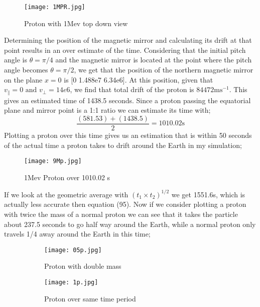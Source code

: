 \documentclass[14paper,11pt,hidelinks]{article}
\begin{document}
\begin{figure}[h!]
\centering
\texttt{[image: 1MPR.jpg]} 
\caption{Proton with 1Mev top down view}
\end{figure}
\FloatBarrier
\noindent
Determining the position of the magnetic mirror and calculating its drift at that point results in an over estimate of the time. Considering that the initial pitch angle is \begin{math}\theta=\pi/4\end{math} and the magnetic mirror is located at the point where the pitch angle becomes \begin{math} \theta=\pi/2 \end{math}, we get that the position of the northern magnetic mirror on the plane \begin{math}x=0\end{math} is [0 1.488e7 6.34e6]. 
\newline
\newline
At this position, given that \begin{math}v_\parallel=0 \mbox{ and } v_\bot=14e6\end{math}, we find that total drift of the proton is \begin{math} 84472 \mbox{ms}^{-1}\end{math}. This gives an estimated time of 1438.5 seconds. Since a proton passing the equatorial plane and mirror point is a 1:1 ratio we can estimate its time with;
\begin{equation}
\frac{(581.53)+(1438.5)}{2}=1010.02\mbox{s}
\end{equation}
Plotting a proton over this time gives us an estimation that is within 50 seconds of the actual time a proton takes to drift around the Earth in my simulation;
\begin{figure}[h!]
\centering
\texttt{[image: 9Mp.jpg]} 
\caption{1Mev Proton over 1010.02 s}
\end{figure}
\FloatBarrier
\noindent
If we look at the geometric average with \begin{math} (t_1\times t_2)^{1/2}\end{math} we get 1551.6s, which is actually less accurate then equation (95).
 Now if we consider plotting a proton with twice the mass of a normal proton we can see that it takes the particle about 237.5 seconds to go half way around the Earth, while a normal proton only travels 1/4 away around the Earth in this time;
\begin{figure}[h!]
\centering
\begin{subfigure}[b]{0.3\linewidth}
\texttt{[image: 05p.jpg]} 
\caption*{Proton with double mass}
\end{subfigure}
\begin{subfigure}[b]{0.3\linewidth}
\texttt{[image: 1p.jpg]}
\caption*{Proton over same time period}
\end{subfigure}
\caption{}
\end{figure}
\end{document}
